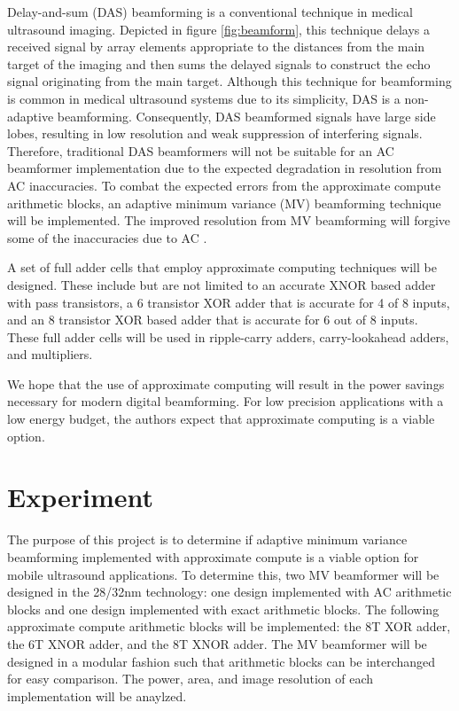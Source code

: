 \documentclass[journal]{IEEEtran}
\begin{document}
Delay-and-sum (DAS) beamforming is a conventional technique in medical ultrasound imaging. Depicted in figure \ref{fig:beamform}, this technique delays a received signal by array elements appropriate to the distances from the main target of the imaging and then sums the delayed signals to construct the echo signal originating from the main target. Although this technique for beamforming is common in medical ultrasound systems due to its simplicity, DAS is a non-adaptive beamforming. Consequently, DAS beamformed signals have large side lobes, resulting in low resolution and weak suppression of interfering signals. Therefore, traditional DAS beamformers will not be suitable for an AC beamformer implementation due to the expected degradation in resolution from AC inaccuracies. To combat the expected errors from the approximate compute arithmetic blocks, an adaptive minimum variance (MV) beamforming technique will be implemented. The improved resolution from MV beamforming will forgive some of the inaccuracies due to AC \cite{synnevag2007adaptive}.  

A set of full adder cells that employ approximate computing techniques will be designed. These include but are not limited to an accurate XNOR based adder with pass transistors, a 6 transistor XOR adder that is accurate for 4 of 8 inputs, and an 8 transistor XOR based adder that is accurate for 6 out of 8 inputs. These full adder cells will be used in ripple-carry adders, carry-lookahead adders, and multipliers.

We hope that the use of approximate computing will result in the power savings necessary for modern digital beamforming. For low precision applications with a low energy budget, the authors expect that approximate computing is a viable option.

\section{Experiment}

The purpose of this project is to determine if adaptive minimum variance beamforming implemented with approximate compute is a viable option for mobile ultrasound applications. To determine this, two MV beamformer will be designed in the 28/32nm technology: one design implemented with AC arithmetic blocks and one design implemented with exact arithmetic blocks. The following approximate compute arithmetic blocks will be implemented: the 8T XOR adder, the 6T XNOR adder, and the 8T XNOR adder. The MV beamformer will be designed in a modular fashion such that arithmetic blocks can be interchanged for easy comparison. The power, area, and image resolution of each implementation will be anaylzed.
\end{document}
